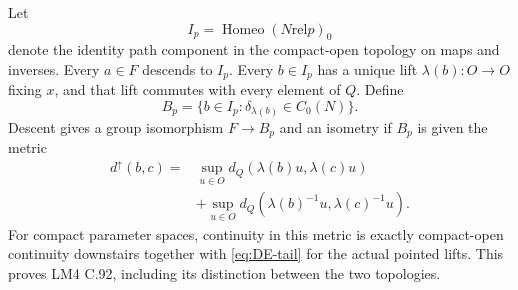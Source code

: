 Let
\[
 I_p=\operatorname{Homeo}(N\mathbin{\mathrm{rel}}p)_0
\]
denote the identity path component in the compact-open topology on
maps and inverses.  Every $a\in F$ descends to $I_p$.  Every $b\in I_p$
has a unique lift $\lambda(b):O\to O$ fixing $x$, and that lift commutes
with every element of $Q$.  Define
\[
 B_p=\{b\in I_p:\delta_{\lambda(b)}\in C_0(N)\}.
\]
Descent gives a group isomorphism $F\to B_p$ and an isometry if $B_p$
is given the metric
\begin{align*}
 d^{\uparrow}(b,c)={}&\sup_{u\in O}d_Q(\lambda(b)u,\lambda(c)u)\\
 &+\sup_{u\in O}d_Q(\lambda(b)^{-1}u,\lambda(c)^{-1}u).
\end{align*}
For compact parameter spaces, continuity in this metric is exactly
compact-open continuity downstairs together with
\eqref{eq:DE-tail} for the actual pointed lifts.  This proves LM4
C.92, including its distinction between the two topologies.
